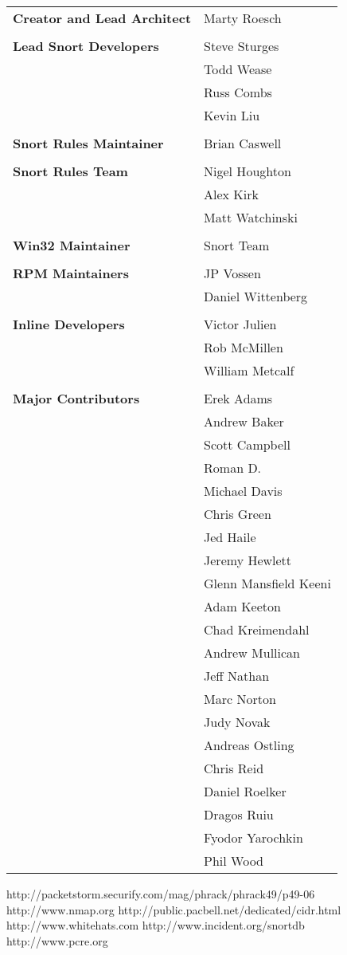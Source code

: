 \documentclass[english]{report}
\begin{document}
\begin{tabular}{p{3in} p{3in}}

\textbf{Creator and Lead Architect} &	 Marty Roesch\\
\\
\textbf{Lead Snort Developers} &	 Steve Sturges\\
 & 					 Todd Wease\\
 & 					 Russ Combs\\
 & 					 Kevin Liu\\
\\
\textbf{Snort Rules Maintainer} & 	 Brian Caswell\\
\\
\textbf{Snort Rules Team} &		 Nigel Houghton\\
 		& 			Alex Kirk\\
		&			Matt Watchinski\\
\\
\textbf{Win32 Maintainer} &	 	Snort Team\\
\\
\textbf{RPM Maintainers} &	 	JP Vossen\\
			&		Daniel Wittenberg\\
\\
\textbf{Inline Developers} &	 	Victor Julien\\
				&	Rob McMillen\\
				& 	William Metcalf\\
\\
\textbf{Major Contributors} &		Erek Adams\\
		&		Andrew Baker\\
		&		Scott Campbell\\
		&		Roman D.\\
		&		Michael Davis\\
		&		Chris Green\\
		&		Jed Haile\\
        &	 Jeremy Hewlett\\
		&		Glenn Mansfield Keeni\\
		&		Adam Keeton\\
		&		Chad Kreimendahl\\
        & 		Andrew Mullican\\
		&		Jeff Nathan\\
		&		Marc Norton\\
		&		Judy Novak\\
		&		Andreas Ostling\\
        &	 	Chris Reid\\
        & 	    Daniel Roelker\\
		&		Dragos Ruiu\\
		&		Fyodor Yarochkin\\
		&		Phil Wood
\end{tabular}
\appendix

\begin{thebibliography}{99}
http://packetstorm.securify.com/mag/phrack/phrack49/p49-06
http://www.nmap.org
http://public.pacbell.net/dedicated/cidr.html
http://www.whitehats.com
http://www.incident.org/snortdb
http://www.pcre.org
\end{thebibliography}
\end{document}
